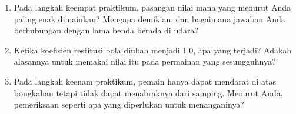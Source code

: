 \begin{refleksibox}
\begin{enumerate}
  \item Pada langkah keempat praktikum, pasangan nilai mana yang menurut Anda
        paling enak dimainkan? Mengapa demikian, dan bagaimana jawaban Anda
        berhubungan dengan lama benda berada di udara?
  \item Ketika koefisien restitusi bola diubah menjadi 1,0, apa yang terjadi?
        Adakah alasannya untuk memakai nilai itu pada permainan yang
        sesungguhnya?
  \item Pada langkah keenam praktikum, pemain hanya dapat mendarat di atas
        bongkahan tetapi tidak dapat menabraknya dari samping. Menurut Anda,
        pemeriksaan seperti apa yang diperlukan untuk menanganinya?
\end{enumerate}
\end{refleksibox}
